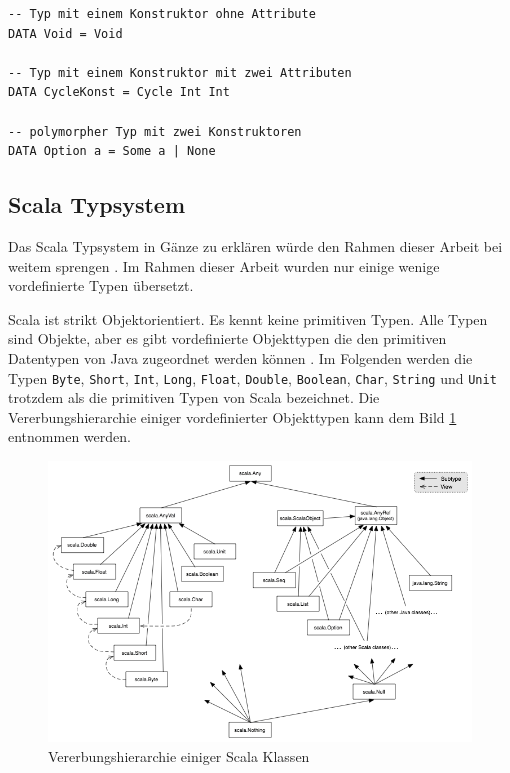 \documentclass[12pt,bibtotoc]{scrreprt}
\begin{document}
\begin{lstlisting}[caption=Beispiele für selbst definierte Datentypen in \ac{SL}, label=lst:bsp2]
-- Typ mit einem Konstruktor ohne Attribute
DATA Void = Void

-- Typ mit einem Konstruktor mit zwei Attributen
DATA CycleKonst = Cycle Int Int

-- polymorpher Typ mit zwei Konstruktoren 
DATA Option a = Some a | None
\end{lstlisting}

\subsection{Scala Typsystem}

Das Scala Typsystem in Gänze zu erklären würde den Rahmen dieser Arbeit bei weitem sprengen \cite{Odersky2013}. Im Rahmen dieser Arbeit wurden nur einige wenige vordefinierte Typen übersetzt.

Scala ist strikt Objektorientiert. Es kennt keine primitiven Typen. Alle Typen sind Objekte, aber es gibt vordefinierte Objekttypen die den primitiven Datentypen von Java zugeordnet werden können \cite{Paggen2013}. Im Folgenden werden die Typen \lstinline!Byte!, \lstinline!Short!, \lstinline!Int!, \lstinline!Long!, \lstinline!Float!, \lstinline!Double!, \lstinline!Boolean!, \lstinline!Char!, \lstinline!String! und \lstinline!Unit! trotzdem als die primitiven Typen von Scala bezeichnet. Die Vererbungshierarchie einiger vordefinierter Objekttypen kann dem Bild \ref{fig:classhierarchy} entnommen werden.

\begin{figure}[h] 
  \centering
     \includegraphics[width=\textwidth]{Bilder/classhierarchy}
  \caption{Vererbungshierarchie einiger Scala Klassen \cite{UnbekannterAutor2013}}
  \label{fig:classhierarchy}
\end{figure}
\end{document}
